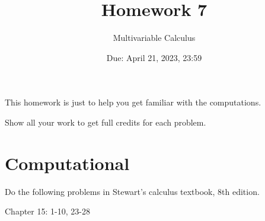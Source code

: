 \documentclass[12pt]{article}
\title{Homework 7}
\author{ Multivariable Calculus}
\date{Due: April 21, 2023, 23:59}
\theoremstyle{definition}
\begin{document}
\maketitle

This homework is just to help you get familiar with the computations. 


Show all your work to get full credits for each problem.
\section{Computational}
Do the following problems in Stewart's calculus textbook, 8th edition.

Chapter 15: 1-10, 23-28





%
\end{document}
